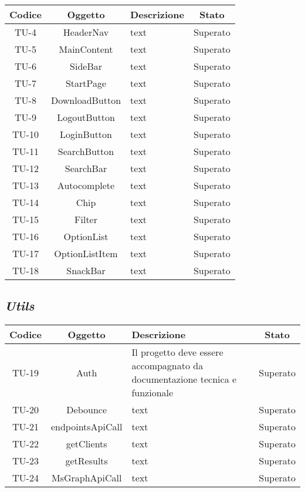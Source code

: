 \begin{center}
  \label{tab:test-unita-componenti}
  \begin{longtable}{|c|c|p{}|c|}
  \hline
  \textbf{Codice} & \textbf{Oggetto} & \textbf{Descrizione} & \textbf{Stato}\\
  \hline
  TU-4 &HeaderNav &text &Superato \\
  \hline
  TU-5 &MainContent &text &Superato \\
  \hline
  TU-6 &SideBar &text &Superato \\
  \hline
  TU-7 &StartPage &text &Superato \\
  \hline
  TU-8 &DownloadButton &text &Superato \\
  \hline
  TU-9 &LogoutButton &text &Superato \\
  \hline
  TU-10 &LoginButton &text &Superato \\
  \hline
  TU-11 &SearchButton &text &Superato \\
  \hline
  TU-12 &SearchBar &text &Superato \\
  \hline
  TU-13 &Autocomplete &text &Superato \\
  \hline
  TU-14 &Chip &text &Superato \\
  \hline
  TU-15 &Filter &text &Superato \\
  \hline
  TU-16 &OptionList &text &Superato \\
  \hline
  TU-17 &OptionListItem &text &Superato \\
  \hline
  TU-18 &SnackBar &text &Superato \\
  \hline
\end{longtable}
\end{center}

\subsection*{\emph{Utils}}


\begin{center}
  \label{tab:test-unita-utils}
  \begin{longtable}{|c|c|p{}|c|}
  \hline
  \textbf{Codice} & \textbf{Oggetto} & \textbf{Descrizione} & \textbf{Stato}\\
  \hline
  TU-19 &Auth &Il progetto deve essere accompagnato da documentazione tecnica e funzionale & Superato \\
  \hline
  TU-20 &Debounce &text &Superato \\
  \hline
  TU-21 &endpointsApiCall &text &Superato \\
  \hline
  TU-22 &getClients &text &Superato \\
  \hline
  TU-23 &getResults &text &Superato \\
  \hline
  TU-24 &MsGraphApiCall &text &Superato \\
  \hline
\end{longtable}
\end{center}




